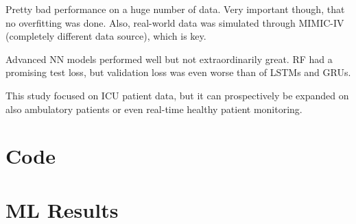 \documentclass[12pt, bibliography=totoc]{scrartcl}
\begin{document}
    Pretty bad performance on a huge number of data.
    Very important though, that no overfitting was done.
    Also, real-world data was simulated through MIMIC-IV (completely different data source), which is key.

    Advanced NN models performed well but not extraordinarily great.
    RF had a promising test loss, but validation loss was even worse than of LSTMs and GRUs.

    This study focused on ICU patient data, but it can prospectively be expanded on also ambulatory patients or even real-time healthy patient monitoring.

    \newpage

    \singlespacing
    \small
    
    \normalsize

    \newpage
    \appendix


    \section{Code}\label{sec:code}
    

    \newpage

    \section{ML Results}\label{sec:ml_results}
    
\end{document}
